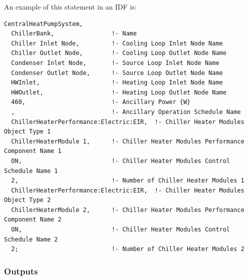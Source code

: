 An example of this statement in an IDF is:

\begin{lstlisting}
CentralHeatPumpSystem,
  ChillerBank,                !- Name
  Chiller Inlet Node,         !- Cooling Loop Inlet Node Name
  Chiller Outlet Node,        !- Cooling Loop Outlet Node Name
  Condenser Inlet Node,       !- Source Loop Inlet Node Name
  Condenser Outlet Node,      !- Source Loop Outlet Node Name
  HWInlet,                    !- Heating Loop Inlet Node Name
  HWOutlet,                   !- Heating Loop Outlet Node Name
  460,                        !- Ancillary Power {W}
  ,                           !- Ancillary Operation Schedule Name
  ChillerHeaterPerformance:Electric:EIR,  !- Chiller Heater Modules Object Type 1
  ChillerHeaterModule 1,      !- Chiller Heater Modules Performance Component Name 1
  ON,                         !- Chiller Heater Modules Control Schedule Name 1
  2,                          !- Number of Chiller Heater Modules 1
  ChillerHeaterPerformance:Electric:EIR,  !- Chiller Heater Modules Object Type 2
  ChillerHeaterModule 2,      !- Chiller Heater Modules Performance Component Name 2
  ON,                         !- Chiller Heater Modules Control Schedule Name 2
  2;                          !- Number of Chiller Heater Modules 2
\end{lstlisting}

\subsubsection{Outputs}\label{outputs-17-000}

